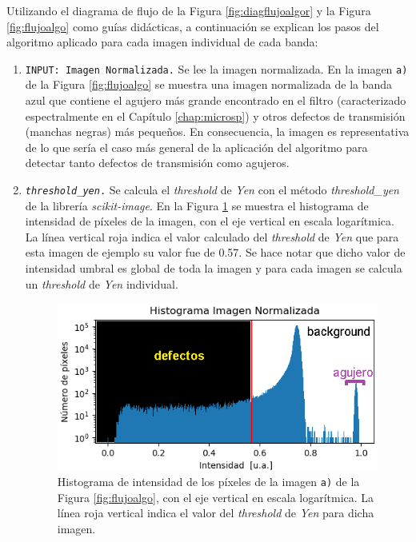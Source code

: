 Utilizando el diagrama de flujo de la Figura \ref{fig:diagflujoalgor} y la Figura \ref{fig:flujoalgo} como guías didácticas, a continuación se explican los pasos del algoritmo aplicado para cada imagen individual de cada banda:
\begin{enumerate}
\justifying
\item \texttt{INPUT: Imagen Normalizada.} Se lee la imagen normalizada. En la imagen \texttt{a)} de la Figura \ref{fig:flujoalgo} se muestra una imagen normalizada de la banda azul que contiene el agujero más grande encontrado en el filtro (caracterizado espectralmente en el Capítulo \ref{chap:microsp}) y otros defectos de transmisión (manchas negras) más pequeños. En consecuencia, la imagen es representativa de lo que sería el caso más general de la aplicación del algoritmo para detectar tanto defectos de transmisión como agujeros. 
\item \texttt{\textit{threshold\_yen}.} Se calcula el \textit{threshold} de \textit{Yen} con el método \textit{threshold\_yen} de la librería \textit{scikit-image}. En la Figura \ref{fig:histalgor} se muestra el histograma de intensidad de píxeles de la imagen, con el eje vertical en escala logarítmica. La línea vertical roja indica el valor calculado del \textit{threshold} de \textit{Yen} que para esta imagen de ejemplo su valor fue de 0.57. Se hace notar que dicho valor de intensidad umbral es global de toda la imagen y para cada imagen se calcula un \textit{threshold} de \textit{Yen} individual.

\begin{figure}[H]
\centering
\includegraphics[scale=1.65]{Figs/defectosZEISS/hist_algor_agujero.png}
\caption{Histograma de intensidad de los píxeles de la imagen \texttt{a)} de la Figura \ref{fig:flujoalgo}, con el eje vertical en escala logarítmica. La línea roja vertical indica el valor del \textit{threshold} de \textit{Yen} para dicha imagen.}
\label{fig:histalgor}
\end{figure}


\end{enumerate}
